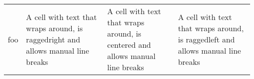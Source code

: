 \documentclass{article}
\begin{document}
\begin{tabular}{| c | L{3cm} | C{3cm} | R{3cm} |}
foo &
A cell with text that wraps around, is raggedright and allows \newline
    manual line breaks &
A cell with text that wraps around, is centered and allows \newline
    manual line breaks &
A cell with text that wraps around, is raggedleft and allows \newline
    manual line breaks \\
\end{tabular}
\end{document}

